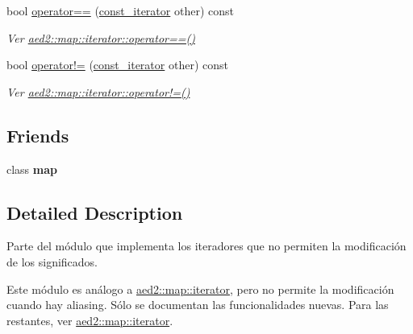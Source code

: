\begin{DoxyCompactItemize}
\mbox{\label{classaed2_1_1iterator_1_1const__iterator_aa96bbb56e80fa97a9974ef97c826fe3a}} 
bool \hyperlink{classaed2_1_1iterator_1_1const__iterator_aa96bbb56e80fa97a9974ef97c826fe3a}{operator==} (\hyperlink{classaed2_1_1iterator_1_1const__iterator}{const\+\_\+iterator} other) const
\begin{DoxyCompactList}\small\item\em Ver \hyperlink{classaed2_1_1map_1_1iterator_a34f6622845af93ca42f1be8516eeafa2}{aed2\+::map\+::iterator\+::operator==()} \end{DoxyCompactList}\item 
\mbox{\label{classaed2_1_1iterator_1_1const__iterator_ac9d9eb5bae19cd792c4e92dcc0426e81}} 
bool \hyperlink{classaed2_1_1iterator_1_1const__iterator_ac9d9eb5bae19cd792c4e92dcc0426e81}{operator!=} (\hyperlink{classaed2_1_1iterator_1_1const__iterator}{const\+\_\+iterator} other) const
\begin{DoxyCompactList}\small\item\em Ver \hyperlink{classaed2_1_1map_1_1iterator_a748cdf8c35707d1c2e9ef8ef9d862d37}{aed2\+::map\+::iterator\+::operator!=()} \end{DoxyCompactList}\end{DoxyCompactItemize}
\subsection*{Friends}
\begin{DoxyCompactItemize}
\item 
\mbox{\label{classaed2_1_1iterator_1_1const__iterator_aeda338414e516b47761f994fb78056c6}} 
class {\bfseries map}
\end{DoxyCompactItemize}


\subsection{Detailed Description}
Parte del módulo que implementa los iteradores que no permiten la modificación de los significados. 

Este módulo es análogo a \hyperlink{classaed2_1_1map_1_1iterator}{aed2\+::map\+::iterator}, pero no permite la modificación cuando hay aliasing. Sólo se documentan las funcionalidades nuevas. Para las restantes, ver \hyperlink{classaed2_1_1map_1_1iterator}{aed2\+::map\+::iterator}. 

